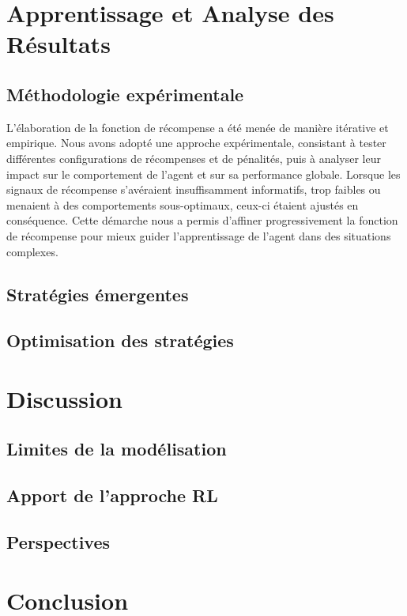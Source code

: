 \documentclass[a4paper,12pt]{article}
\begin{document}
\section{Apprentissage et Analyse des Résultats}

\subsection{Méthodologie expérimentale}

L’élaboration de la fonction de récompense a été menée de manière itérative et empirique. Nous avons adopté une approche expérimentale, consistant à tester différentes configurations de récompenses et de pénalités, puis à analyser leur impact sur le comportement de l’agent et sur sa performance globale.
Lorsque les signaux de récompense s’avéraient insuffisamment informatifs, trop faibles ou menaient à des comportements sous-optimaux, ceux-ci étaient ajustés en conséquence. Cette démarche nous a permis d’affiner progressivement la fonction de récompense pour mieux guider l’apprentissage de l’agent dans des situations complexes.

\subsection{Stratégies émergentes}

\subsection{Optimisation des stratégies}

\section{Discussion}

\subsection{Limites de la modélisation}

\subsection{Apport de l'approche RL}

\subsection{Perspectives}

\section{Conclusion}

\newpage
\printbibliography
\end{document}
